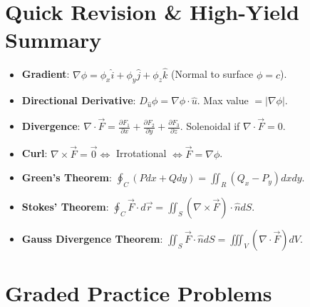 \section{Quick Revision \& High-Yield Summary}

\begin{quickrevision}
\begin{itemize}
    \item \textbf{Gradient}: $\nabla\phi = \phi_x\hat{i} + \phi_y\hat{j} + \phi_z\hat{k}$ (Normal to surface $\phi=c$).
    \item \textbf{Directional Derivative}: $D_{\hat{u}}\phi = \nabla\phi \cdot \hat{u}$. Max value $= |\nabla\phi|$.
    \item \textbf{Divergence}: $\nabla\cdot\vec{F} = \frac{\partial F_1}{\partial x} + \frac{\partial F_2}{\partial y} + \frac{\partial F_3}{\partial z}$. Solenoidal if $\nabla\cdot\vec{F} = 0$.
    \item \textbf{Curl}: $\nabla\times\vec{F} = \vec{0} \iff$ Irrotational $\iff \vec{F} = \nabla\phi$.
    \item \textbf{Green's Theorem}: $\oint_C (P dx + Q dy) = \iint_R (Q_x - P_y) dx dy$.
    \item \textbf{Stokes' Theorem}: $\oint_C \vec{F}\cdot d\vec{r} = \iint_S (\nabla\times\vec{F})\cdot\hat{n} dS$.
    \item \textbf{Gauss Divergence Theorem}: $\iint_S \vec{F}\cdot\hat{n} dS = \iiint_V (\nabla\cdot\vec{F}) dV$.
\end{itemize}
\end{quickrevision}

\section{Graded Practice Problems}

